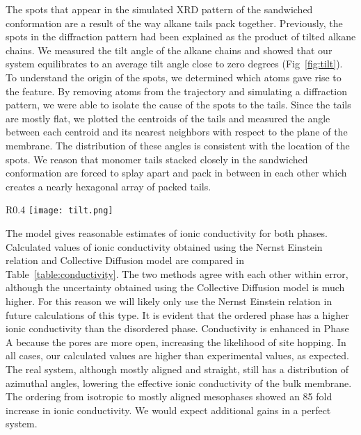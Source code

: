 The spots that appear in the simulated XRD pattern of the sandwiched
conformation are a result of the way alkane tails pack together. Previously,
the spots in the diffraction pattern had been explained as the product of
tilted alkane chains. We measured the tilt angle of the alkane chains and 
showed that our system equilibrates to an average tilt angle close to zero 
degrees (Fig~\ref{fig:tilt}). To understand the origin of the spots, we 
determined which atoms gave rise to the feature. By removing atoms from 
the trajectory and simulating a diffraction pattern, we were able to isolate
the cause of the spots to the tails. Since the tails are mostly flat, we
plotted the centroids of the tails and measured the angle between each centroid 
and its nearest neighbors with respect to the plane of the membrane. The 
distribution of these angles is consistent with the location of the spots.
We reason that monomer tails stacked closely in the sandwiched conformation
are forced to splay apart and pack in between in each other which creates a
nearly hexagonal array of packed tails. 

\begin{wrapfigure}{R}{0.4\textwidth}
	\centering
	\texttt{[image: tilt.png]}
	\caption{The average angle between alkyl chains and the xy plane is nearly zero degrees}\label{fig:tilt}
\end{wrapfigure}

The model gives reasonable estimates of ionic conductivity for both phases.
Calculated values of ionic conductivity obtained using the Nernst Einstein
relation and Collective Diffusion model are compared in Table~\ref{table:conductivity}.
The two methods agree with each other within error, although the 
uncertainty obtained using the Collective Diffusion model is much higher.
For this reason we will likely only use the Nernst Einstein relation
in future calculations of this type. It is evident that the ordered 
phase has a higher ionic conductivity than the disordered phase. 
Conductivity is enhanced in Phase A because the pores are more open,
increasing the likelihood of site hopping. In all cases, our calculated values
are higher than experimental values, as expected. The real system, 
although mostly aligned and straight, still has a distribution of 
azimuthal angles, lowering the effective ionic conductivity of the bulk 
membrane. The ordering from isotropic to mostly aligned mesophases 
showed an 85 fold increase in ionic conductivity. We would expect additional
gains in a perfect system.

